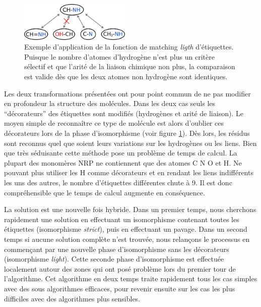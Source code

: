 \begin{figure}[!ht]
  \begin{center}
    \includegraphics[width=200px]{Figures/s2m/recherche/light.png}
    \caption{\label{label_light}Exemple d'application de la fonction de matching \textit{ligth} d'étiquettes.
    Puisque le nombre d'atomes d'hydrogène n'est plus un critère sélectif et que l'arité de la liaison chimique non plus, la comparaison est valide dès que les deux atomes non hydrogène sont identiques.}
  \end{center}
\end{figure}

Les deux transformations présentées ont pour point commun de ne pas modifier en profondeur la structure des molécules.
Dans les deux cas seuls les ``décorateurs'' des étiquettes sont modifiés (hydrogènes et arité de liaison).
Le moyen simple de reconnaître ce type de molécule est alors d'oublier ces décorateurs lors de la phase d'isomorphisme (voir figure \ref{label_light}).
Dès lors, les résidus sont reconnus quel que soient leurs variations sur les hydrogènes ou les liens.
Bien que très séduisante cette méthode pose un problème de temps de calcul.
La plupart des monomères NRP ne contiennent que des atomes C N O et H.
Ne pouvant plus utiliser les H comme décorateurs et en rendant les liens indifférents les uns des autres, le nombre d'étiquettes différentes chute à 9.
Il est donc compréhensible que le temps de calcul augmente en conséquence.

La solution est une nouvelle fois hybride.
Dans un premier temps, nous cherchons rapidement une solution en effectuant un
isomorphisme contenant toutes les étiquettes (isomorphisme {\em strict}), puis en effectuant un pavage.
Dans un second temps si aucune solution complète n'est trouvée, nous relançons le processus en commençant par
une nouvelle phase d'isomorphisme sans les décorateurs (isomorphisme \textit{light}).
Cette seconde phase d'isomorphisme est effectuée localement autour des zones qui ont posé problème lors du premier tour de 
l'algorithme.
Cet algorithme en deux temps traite rapidement tous les cas simples avec des sous algorithmes efficaces, pour revenir ensuite sur les cas les plus difficiles avec des algorithmes plus sensibles.

